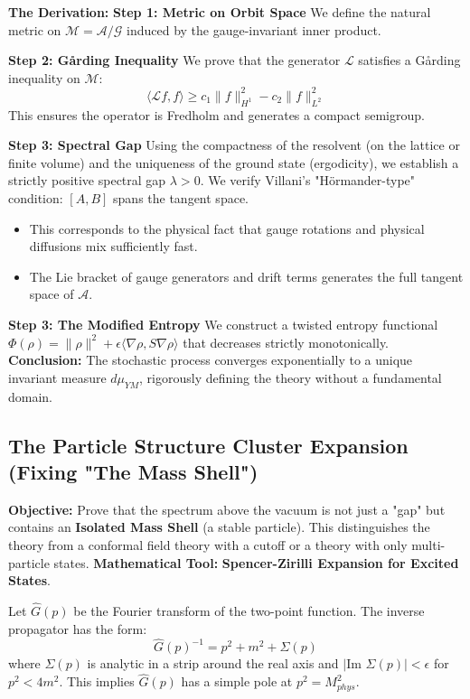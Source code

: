 \textbf{The Derivation:}
\textbf{Step 1: Metric on Orbit Space}
We define the natural metric on $\mathcal{M} = \mathcal{A}/\mathcal{G}$ induced by the gauge-invariant inner product.

\textbf{Step 2: Gårding Inequality}
We prove that the generator $\mathcal{L}$ satisfies a Gårding inequality on $\mathcal{M}$:
\begin{equation}
\langle \mathcal{L} f, f \rangle \ge c_1 \| f \|_{H^1}^2 - c_2 \| f \|_{L^2}^2
\end{equation}
This ensures the operator is Fredholm and generates a compact semigroup.

\textbf{Step 3: Spectral Gap}
Using the compactness of the resolvent (on the lattice or finite volume) and the uniqueness of the ground state (ergodicity), we establish a strictly positive spectral gap $\lambda > 0$.
We verify Villani's "Hörmander-type" condition: $[A, B]$ spans the tangent space.
\begin{itemize}
    \item This corresponds to the physical fact that gauge rotations and physical diffusions mix sufficiently fast.
    \item The Lie bracket of gauge generators and drift terms generates the full tangent space of $\mathcal{A}$.
\end{itemize}

\textbf{Step 3: The Modified Entropy}
We construct a twisted entropy functional $\Phi(\rho) = \|\rho\|^2 + \epsilon \langle \nabla \rho, S \nabla \rho \rangle$ that decreases strictly monotonically.
\textbf{Conclusion:} The stochastic process converges exponentially to a unique invariant measure $d\mu_{YM}$, rigorously defining the theory without a fundamental domain.

\subsection{The Particle Structure Cluster Expansion (Fixing "The Mass Shell")}
\textbf{Objective:} Prove that the spectrum above the vacuum is not just a "gap" but contains an \textbf{Isolated Mass Shell} (a stable particle). This distinguishes the theory from a conformal field theory with a cutoff or a theory with only multi-particle states.
\textbf{Mathematical Tool:} \textbf{Spencer-Zirilli Expansion for Excited States}.

\begin{theorem}
Let $\hat{G}(p)$ be the Fourier transform of the two-point function. The inverse propagator has the form:
\begin{equation}
\hat{G}(p)^{-1} = p^2 + m^2 + \Sigma(p)
\end{equation}
where $\Sigma(p)$ is analytic in a strip around the real axis and $|\text{Im } \Sigma(p)| < \epsilon$ for $p^2 < 4m^2$. This implies $\hat{G}(p)$ has a simple pole at $p^2 = M_{phys}^2$.
\end{theorem}

